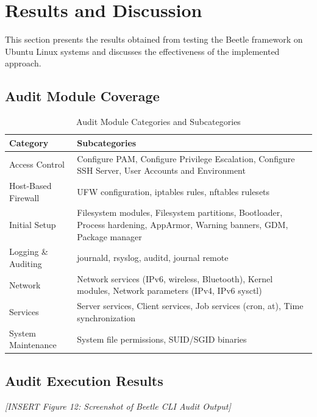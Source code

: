 \pagebreak
\section{Results and Discussion}

This section presents the results obtained from testing the Beetle framework on Ubuntu Linux systems and discusses the effectiveness of the implemented approach.

\subsection{Audit Module Coverage}

\begin{table}[H]
\centering
\caption{Audit Module Categories and Subcategories}
\begin{tabular}{|l|p{8cm}|}
\hline
\textbf{Category} & \textbf{Subcategories} \\
\hline
Access Control & Configure PAM, Configure Privilege Escalation, Configure SSH Server, User Accounts and Environment \\
\hline
Host-Based Firewall & UFW configuration, iptables rules, nftables rulesets \\
\hline
Initial Setup & Filesystem modules, Filesystem partitions, Bootloader, Process hardening, AppArmor, Warning banners, GDM, Package manager \\
\hline
Logging \& Auditing & journald, rsyslog, auditd, journal remote \\
\hline
Network & Network services (IPv6, wireless, Bluetooth), Kernel modules, Network parameters (IPv4, IPv6 sysctl) \\
\hline
Services & Server services, Client services, Job services (cron, at), Time synchronization \\
\hline
System Maintenance & System file permissions, SUID/SGID binaries \\
\hline
\end{tabular}
\label{tab:auditmodules}
\end{table}

\subsection{Audit Execution Results}

\vspace{0.5cm}
\noindent\textit{[INSERT Figure 12: Screenshot of Beetle CLI Audit Output]}
\vspace{0.5cm}

